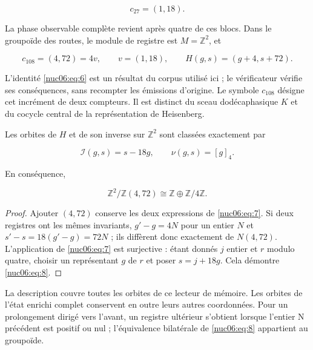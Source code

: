 \[
c_{27}=(1,18).
\]

La phase observable complète revient après quatre de ces blocs. Dans le groupoïde des routes, le module de registre est \(M=\mathbb Z^2\), et


\begin{equation}
c_{108}=(4,72)=4v,\qquad v=(1,18),\qquad
H(g,s)=(g+4,s+72).
\label{nuc06:eq:6}
\end{equation}

L’identité \eqref{nuc06:eq:6} est un résultat du corpus utilisé ici ; le vérificateur vérifie ses conséquences, sans recompter les émissions d’origine. Le symbole \(c_{108}\) désigne cet incrément de deux compteurs. Il est distinct du sceau dodécaphasique \(K\) et du cocycle central de la représentation de Heisenberg.

\begin{theorem}

Les orbites de \(H\) et de son inverse sur \(\mathbb Z^2\) sont classées exactement par


\begin{equation}
\boxed{\quad \mathcal I(g,s)=s-18g,\qquad \nu(g,s)=[g]_4.\quad}
\label{nuc06:eq:7}
\end{equation}

En conséquence,

\begin{equation}
\mathbb Z^2/\mathbb Z(4,72)\cong\mathbb Z\oplus\mathbb Z/4\mathbb Z.
\label{nuc06:eq:8}
\end{equation}
\end{theorem}

\begin{proof}
Ajouter \((4,72)\) conserve les deux expressions de \eqref{nuc06:eq:7}. Si deux registres ont les mêmes invariants, \(g'-g=4N\) pour un entier \(N\) et \(s'-s=18(g'-g)=72N\) ; ils diffèrent donc exactement de \(N(4,72)\). L’application de \eqref{nuc06:eq:7} est surjective : étant donnés \(j\) entier et \(r\) modulo quatre, choisir un représentant \(g\) de \(r\) et poser \(s=j+18g\). Cela démontre \eqref{nuc06:eq:8}.
\end{proof}

La description couvre toutes les orbites de ce lecteur de mémoire. Les orbites de l’état enrichi complet conservent en outre leurs autres coordonnées. Pour un prolongement dirigé vers l’avant, un registre ultérieur s’obtient lorsque l’entier N précédent est positif ou nul ; l’équivalence bilatérale de \eqref{nuc06:eq:8} appartient au groupoïde.


